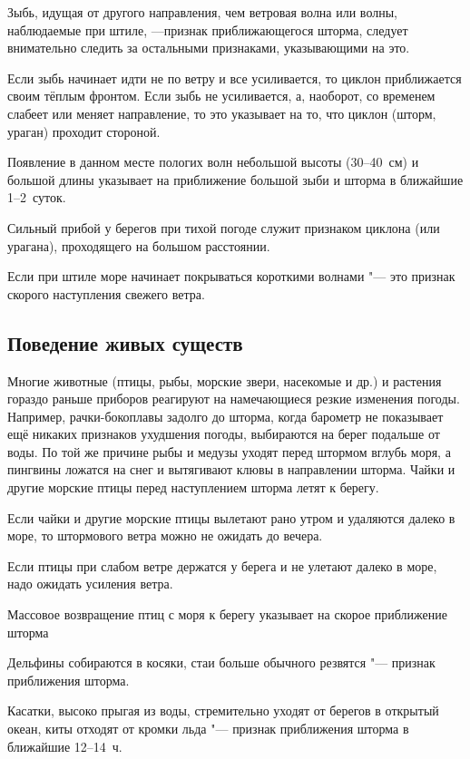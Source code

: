  Зыбь, идущая от другого направления, чем ветровая волна или
волны, наблюдаемые при штиле, —признак приближающегося шторма, следует
внимательно следить за остальными признаками, указывающими на это.

 Если зыбь начинает идти не по ветру и все усиливается, то
циклон приближается своим тёплым фронтом. Если зыбь не усиливается, а,
наоборот, со временем слабеет или меняет направление, то это указывает
на то, что циклон (шторм, ураган) проходит стороной.

 Появление в данном месте пологих волн небольшой высоты (30--40~см)
и большой длины указывает на приближение большой зыби и шторма в
ближайшие 1--2~суток.

 Сильный прибой у берегов при тихой погоде служит признаком
циклона (или урагана), проходящего на большом расстоянии.

 Если при штиле море начинает покрываться короткими волнами
"--- это признак скорого наступления свежего ветра.

\subsection{Поведение живых существ}

Многие животные (птицы, рыбы, морские звери, насекомые и др.) и
растения гораздо раньше приборов реагируют на намечающиеся резкие
изменения погоды. Например, рачки-бокоплавы задолго до шторма, когда
барометр не показывает ещё никаких признаков ухудшения погоды,
выбираются на берег подальше от воды. По той же причине рыбы и медузы
уходят перед штормом вглубь моря, а пингвины ложатся на снег и
вытягивают клювы в направлении шторма. Чайки и другие морские птицы
перед наступлением шторма летят к берегу.

 Если чайки и другие морские птицы вылетают рано утром и
удаляются далеко в море, то штормового ветра можно не ожидать до
вечера.

 Если птицы при слабом ветре держатся у берега и не улетают далеко
в море, надо ожидать усиления ветра.

 Массовое возвращение птиц с моря к берегу указывает на скорое
приближение шторма

 Дельфины собираются в косяки, стаи больше обычного резвятся
"--- признак приближения шторма.

 Касатки, высоко прыгая из воды, стремительно уходят от берегов
в открытый океан, киты отходят от кромки льда "--- признак приближения
шторма в ближайшие 12--14~ч.

